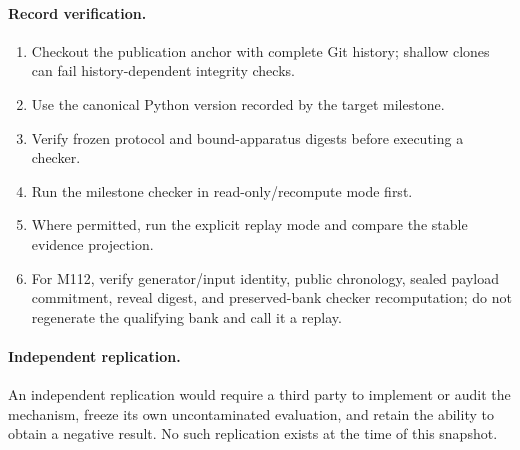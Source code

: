 \paragraph{Record verification.}
\begin{enumerate}
  \item Checkout the publication anchor with complete Git history; shallow clones can fail history-dependent integrity checks.
  \item Use the canonical Python version recorded by the target milestone.
  \item Verify frozen protocol and bound-apparatus digests before executing a checker.
  \item Run the milestone checker in read-only/recompute mode first.
  \item Where permitted, run the explicit replay mode and compare the stable evidence projection.
  \item For M112, verify generator/input identity, public chronology, sealed payload commitment, reveal digest, and preserved-bank checker recomputation; do not regenerate the qualifying bank and call it a replay.
\end{enumerate}

\paragraph{Independent replication.}
An independent replication would require a third party to implement or audit the mechanism, freeze its own uncontaminated evaluation, and retain the ability to obtain a negative result. No such replication exists at the time of this snapshot.

